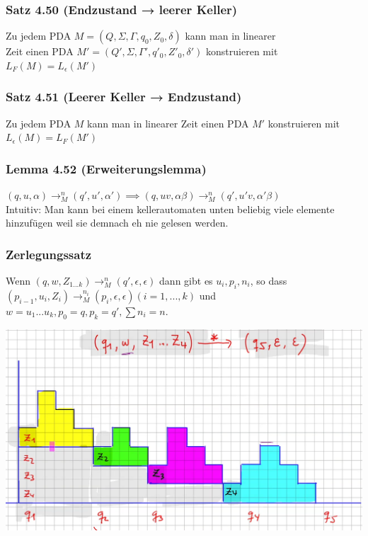 \documentclass[11pt]{article}
\begin{document}
\subsubsection{Satz 4.50 (Endzustand → leerer Keller)}
\label{sec:org2d60d04}
Zu jedem PDA \(M = (Q, \Sigma, \Gamma, q_0, Z_0, \delta)\) kann man in linearer \\
Zeit einen PDA \(M' = (Q', \Sigma, \Gamma', q'_0, Z'_0, \delta′)\) konstruieren mit \\
\(L_F(M) = L_\epsilon(M')\)

\subsubsection{Satz 4.51 (Leerer Keller → Endzustand)}
\label{sec:org74d0ce8}
Zu jedem PDA \(M\) kann man in linearer Zeit einen PDA \(M'\) konstruieren mit \\
\(L_\epsilon(M) = L_F(M')\)

\subsubsection{Lemma 4.52 (Erweiterungslemma)}
\label{sec:orgb41545e}
\((q, u, \alpha) \rightarrow^n_M (q', u', \alpha') \implies (q, uv, \alpha \beta) \rightarrow^n_M (q', u'v, \alpha'\beta)\) \\
Intuitiv: Man kann bei einem kellerautomaten unten beliebig viele elemente hinzufügen weil sie demnach eh nie gelesen werden.

\subsubsection{Zerlegungssatz}
\label{sec:org7f5d2a7}
Wenn \((q, w, Z_{1...k}) \rightarrow^n_M (q', \epsilon, \epsilon)\)
dann gibt es \(u_i, p_i, n_i\), so dass
\((p_{i−1}, u_i, Z_i) \rightarrow^{n_i}_M (p_i, \epsilon, \epsilon) (i = 1, . . . , k)\)
und \(w = u_1 . . . u_k, p_0 = q, p_k = q', \sum n_i = n\).
\begin{center}
\includegraphics[width=.9\linewidth]{./img/3-kapitel/zerlegungssatz.png}
\end{center}
\end{document}
